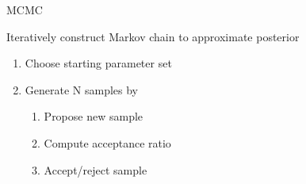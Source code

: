 \documentclass[12pt]{beamer}
\begin{document}
\begin{frame}

	\begin{columns}
		\begin{column}{0.5\textwidth}

			\large
			MCMC
			\vspace{\baselineskip}

			\normalsize
			Iteratively construct Markov chain to approximate posterior

			\vspace{\baselineskip}

			\footnotesize
			\begin{enumerate}
				\item Choose starting parameter set
				\item Generate N samples by
				\begin{enumerate}
					\footnotesize
					\item Propose new sample
					\item Compute acceptance ratio
					\item Accept/reject sample
				\end{enumerate}
			\end{enumerate}
			
		\end{column}
		\begin{column}{0.5\textwidth}

			\tiny
			\begin{algorithm}[H]

		        \BlankLine

		        \DontPrintSemicolon


		        \BlankLine

\end{algorithm}
\end{column}
\end{columns}
\end{frame}
\end{document}
